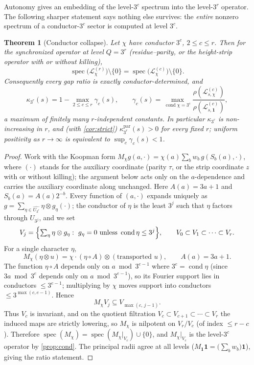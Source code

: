 \documentclass[11pt]{article}
\newcommand{\Lcal}{\mathcal{L}}
\theoremstyle{plain}
\newtheorem{theorem}{Theorem}
\theoremstyle{definition}
\theoremstyle{remark}
\begin{document}
Autonomy gives an embedding of the level-$3^c$ spectrum into the level-$3^r$
operator. The following sharper statement says nothing else survives: the
\emph{entire} nonzero spectrum of a conductor-$3^c$ sector is computed at level
$3^c$.

\begin{theorem}[Conductor collapse]\label{thm:collapse}
Let $\chi$ have conductor $3^c$, $2\le c\le r$. Then for the synchronized
operator at level $Q=3^r$ (residue--parity, or the height-strip operator with or
without killing),
\[
\operatorname{spec}\bigl(\Lcal^{(r)}_{\chi}\bigr)\setminus\{0\}
=\operatorname{spec}\bigl(\Lcal^{(c)}_{\chi}\bigr)\setminus\{0\}.
\]
Consequently every gap ratio is exactly conductor-determined, and
\[
\kappa_{3^r}(s)=1-\max_{2\le c\le r}\gamma_c(s),
\qquad
\gamma_c(s)=\max_{\operatorname{cond}\chi=3^c}
\frac{\rho(\Lcal^{(c)}_{s,\chi})}{\rho(\Lcal^{(c)}_{s,\mathbf1})},
\]
a maximum of finitely many $r$-independent constants. In particular
$\kappa_{3^r}$ is non-increasing in $r$, and (with \cref{cor:strict})
$\kappa^{\mathrm{par}}_{3^r}(s)>0$ for every fixed $r$; uniform positivity as
$r\to\infty$ is equivalent to $\sup_c\gamma_c(s)<1$.
\end{theorem}
\begin{proof}
Work with the Koopman form $M_\chi g(a,\cdot)=\chi(a)\sum_b w_b\,g(S_b(a),\cdot)$,
where $(\cdot)$ stands for the auxiliary coordinate (parity $\tau$, or the strip
coordinate $z$ with or without killing); the argument below acts only on the
$a$-dependence and carries the auxiliary coordinate along unchanged. Here
$A(a)=3a+1$ and $S_b(a)=A(a)2^{-b}$. Every function of $(a,\cdot)$ expands
uniquely as $g=\sum_{\eta\in\widehat{U_{3^r}}}\eta\otimes g_\eta(\cdot)$; the
conductor of $\eta$ is the least $3^j$ such that $\eta$ factors through
$U_{3^j}$, and we set
\[
V_j=\Bigl\{\textstyle\sum_\eta\eta\otimes g_\eta:\ g_\eta=0\text{ unless }
\operatorname{cond}\eta\le3^j\Bigr\},
\qquad V_0\subset V_1\subset\cdots\subset V_r .
\]
For a single character $\eta$,
\[
M_\chi(\eta\otimes u)=\chi\cdot(\eta\circ A)\otimes(\text{transported }u),
\qquad A(a)=3a+1 .
\]
The function $\eta\circ A$ depends only on $a\bmod3^{e-1}$ where
$3^e=\operatorname{cond}\eta$ (since $3a\bmod3^{e}$ depends only on
$a\bmod3^{e-1}$), so its Fourier support lies in conductors $\le3^{e-1}$;
multiplying by $\chi$ moves support into conductors $\le3^{\max(c,e-1)}$. Hence
\[
M_\chi V_j\subseteq V_{\max(c,\,j-1)} .
\]
Thus $V_c$ is invariant, and on the quotient filtration
$V_c\subset V_{c+1}\subset\cdots\subset V_r$ the induced maps are strictly
lowering, so $M_\chi$ is nilpotent on $V_r/V_c$ (of index $\le r-c$). Therefore
$\operatorname{spec}(M_\chi)=\operatorname{spec}(M_\chi|_{V_c})\cup\{0\}$, and
$M_\chi|_{V_c}$ is the level-$3^c$ operator by \cref{prop:cond}. The principal
radii agree at all levels ($M_{\mathbf1}\mathbf1=\bigl(\sum_bw_b\bigr)\mathbf1$),
giving the ratio statement.
\end{proof}
\end{document}
